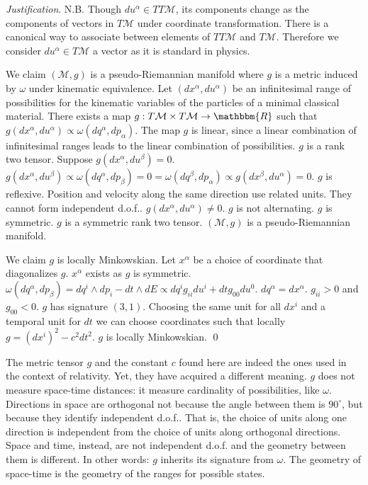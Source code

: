 \documentclass[aps,pra,10pt,twocolumn,floatfix,nofootinbib]{revtex4-1}
\numberwithin{equation}{section}
\theoremstyle{definition}
\newenvironment{justification}{\emph{Justification}.}{\qed}
\begin{document}
\begin{justification}
	N.B. Though $du^\alpha \in TT\mathcal{M}$, its components change as the components of vectors in $T\mathcal{M}$ under coordinate transformation. There is a canonical way to associate between elements of $TT\mathcal{M}$ and $T\mathcal{M}$. Therefore we consider $du^\alpha \in T\mathcal{M}$ a vector as it is standard in physics.
	
	We claim $(\mathcal{M}, g)$ is a pseudo-Riemannian manifold where $g$ is a metric induced by $\omega$ under kinematic equivalence. Let $(dx^\alpha, du^\alpha)$ be an infinitesimal range of possibilities for the kinematic variables of the particles of a minimal classical material. There exists a map $g : T\mathcal{M} \times T\mathcal{M} \rightarrow \mathbbm{R}$ such that $g(dx^\alpha, du^\alpha) \propto \omega(dq^\alpha, dp_\alpha)$. The map $g$ is linear, since a linear combination of infinitesimal ranges leads to the linear combination of possibilities. $g$ is a rank two tensor. Suppose $g(dx^\alpha, du^\beta) = 0$. $g(dx^\alpha, du^\beta) \propto \omega(dq^\alpha, dp_\beta) = 0 = \omega(dq^\beta, dp_\alpha) \propto g(dx^\beta, du^\alpha) = 0$. $g$ is reflexive. Position and velocity along the same direction use related units. They cannot form independent d.o.f.. $g(dx^\alpha, du^\alpha) \neq 0$. $g$ is not alternating. $g$ is symmetric. $g$ is a symmetric rank two tensor. $(\mathcal{M}, g)$ is a pseudo-Riemannian manifold.
	
	We claim $g$ is locally Minkowskian. Let $x^\alpha$ be a choice of coordinate that diagonalizes $g$. $x^\alpha$ exists as $g$ is symmetric. $\omega(dq^\alpha, dp_\beta) = dq^i \wedge dp_i - dt \wedge dE \propto dq^i g_{ii} du^i + dt g_{00} du^0$. $dq^\alpha = dx^\alpha$. $g_{ii} > 0$ and $g_{00} < 0$. $g$ has signature $(3, 1)$. Choosing the same unit for all $dx^i$ and a temporal unit for $dt$ we can choose coordinates such that locally $g = (dx^i)^2 - c^2 dt^2$. $g$ is locally Minkowskian.
\end{justification}

The metric tensor $g$ and the constant $c$ found here are indeed the ones used in the context of relativity. Yet, they have acquired a different meaning. $g$ does not measure space-time distances: it measure cardinality of possibilities, like $\omega$. Directions in space are orthogonal not because the angle between them is $90^\circ$, but because they identify independent d.o.f.. That is, the choice of units along one direction is independent from the choice of units along orthogonal directions. Space and time, instead, are not independent d.o.f. and the geometry between them is different. In other words: $g$ inherits its signature from $\omega$. The geometry of space-time is the geometry of the ranges for possible states.
\end{document}
